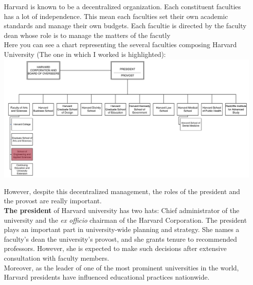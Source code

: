 \documentclass[10pt,a4paper]{article}
\begin{document}
Harvard is known to be a decentralized organization. Each constituent faculties has a lot of independence. This mean each faculties set their own academic standards and manage their own budgets. Each facultie is directed by the faculty dean whose role is to manage the matters of the facutly\\

Here you can see a chart representing the several faculties composing Harvard University (The one in which I worked is highlighted):\\
\includegraphics[width=1\textwidth]{images/chart1.png}

However, despite this decentralized management, the roles of the president and the provost are really important.\\

\textbf{The president} of Harvard university has two hats: Chief administrator of the university and the \textit{ex officio} chairman of the Harvard Corporation.
The president plays an important part in university-wide planning and strategy. She names a faculty's dean the university's provost, and she grants tenure to recommended professors. However, she is expected to make such decisions after extensive consultation with faculty members.\\
Moreover, as the leader of one of the most prominent universities in the world, Harvard presidents have influenced educational practices nationwide.\\
\end{document}
